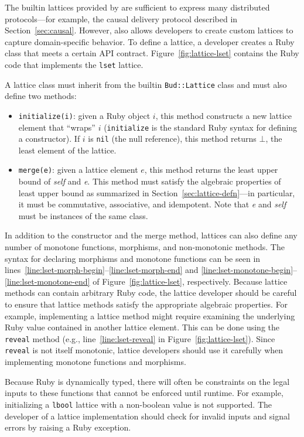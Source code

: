 \label{sec:lattice-api}
The builtin lattices provided by \lang are sufficient to express many
distributed protocols---for example, the causal delivery protocol described in
Section~\ref{sec:causal}. However, \lang also allows developers to create
custom lattices to capture domain-specific behavior. To define a lattice, a
developer creates a Ruby class that meets a certain API
contract. Figure~\ref{fig:lattice-lset} contains the Ruby code that implements
the \texttt{lset} lattice.

A lattice class must inherit from the builtin \texttt{Bud::Lattice} class and
must also define two methods:
\begin{itemize}
\item \texttt{initialize(i)}: given a Ruby object $i$, this method constructs a
  new lattice element that ``wraps'' $i$ (\texttt{initialize} is the standard
  Ruby syntax for defining a constructor). If $i$ is \texttt{nil} (the null
  reference), this method returns $\bot$, the least element of the lattice.

\item \texttt{merge(e)}: given a lattice element $e$, this method returns the
  least upper bound of \emph{self} and \emph{e}. This method must satisfy the
  algebraic properties of least upper bound as summarized in
  Section~\ref{sec:lattice-defn}---in particular, it must be commutative,
  associative, and idempotent. Note that \emph{e} and \emph{self} must be
  instances of the same class.
\end{itemize}
In addition to the constructor and the merge method, lattices can also define
any number of monotone functions, morphisms, and non-monotonic methods. The
syntax for declaring morphisms and monotone functions can be seen in
lines~\ref{line:lset-morph-begin}--\ref{line:lset-morph-end} and
\ref{line:lset-monotone-begin}--\ref{line:lset-monotone-end} of
Figure~\ref{fig:lattice-lset}, respectively. Because lattice methods can contain
arbitrary Ruby code, the lattice developer should be careful to ensure that
lattice methods satisfy the appropriate algebraic properties. For example,
implementing a lattice method might require examining the underlying Ruby value
contained in another lattice element. This can be done using the \texttt{reveal}
method (e.g., line~\ref{line:lset-reveal} in Figure~\ref{fig:lattice-lset}).
Since \texttt{reveal} is not itself monotonic, lattice developers should use it
carefully when implementing monotone functions and morphisms.

Because Ruby is dynamically typed, there will often be constraints on the legal
inputs to these functions that cannot be enforced until runtime. For example,
initializing a \texttt{lbool} lattice with a non-boolean value is not
supported. The developer of a lattice implementation should check for invalid
inputs and signal errors by raising a Ruby exception.

